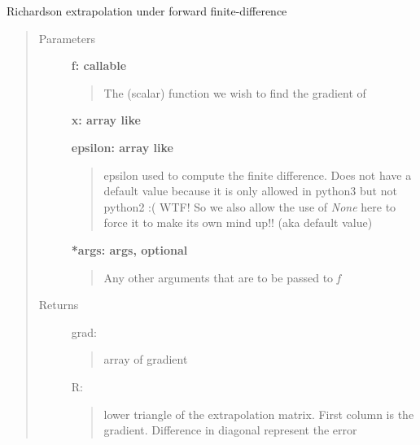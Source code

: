 \documentclass[letterpaper,10pt,english]{sphinxmanual}
\begin{document}
\begin{fulllineitems}
Richardson extrapolation under forward finite-difference
\begin{quote}\begin{description}
\item[{Parameters}] \leavevmode
\textbf{f: callable}
\begin{quote}

The (scalar) function we wish to find the gradient of
\end{quote}

\textbf{x: array like}

\textbf{epsilon: array like}
\begin{quote}

epsilon used to compute the finite difference.  Does not 
have a default value because it is only allowed in 
python3 but not python2 :( WTF!  So we also allow the
use of \emph{None} here to force it to make its own mind
up!! (aka default value)
\end{quote}

\textbf{*args: args, optional}
\begin{quote}

Any other arguments that are to be passed to \emph{f}
\end{quote}

\item[{Returns}] \leavevmode
grad: \href{http://docs.scipy.org/doc/numpy/reference/generated/numpy.ndarray.html\#numpy.ndarray}{}
\begin{quote}

array of gradient
\end{quote}

R: \href{http://docs.scipy.org/doc/numpy/reference/generated/numpy.matrix.html\#numpy.matrix}{}
\begin{quote}

lower triangle of the extrapolation matrix.  First column is 
the gradient. Difference in diagonal represent the error
\end{quote}

\end{description}\end{quote}

\end{fulllineitems}
\end{document}
